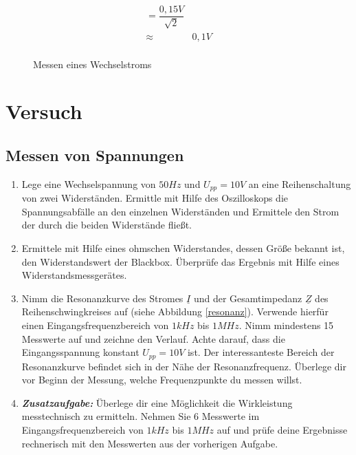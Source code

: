 \begin{figure}[H]
{\begin{minipage}[b]{5cm}
\begin{eqnarray*}
				= \dfrac{0,15V}{\sqrt{2}}\\
 		\approx	& 0,1V\\
\end{eqnarray*}
\end{minipage}
}
\caption{Messen eines Wechselstroms}
\end{figure}

\newpage
\section*{Versuch}

\subsection*{Messen von Spannungen}

\begin{enumerate}
\item Lege eine Wechselspannung von $50Hz$ und  $U_{pp} =10V$ an eine Reihenschaltung von zwei Widerständen. Ermittle mit Hilfe des Oszilloskops die Spannungsabfälle an den einzelnen Widerständen und Ermittele den Strom der durch die beiden Widerstände fließt.
\item Ermittele mit Hilfe eines ohmschen Widerstandes, dessen Größe bekannt ist, den Widerstandswert der Blackbox. Überprüfe das Ergebnis mit Hilfe eines Widerstandsmessgerätes.
\item Nimm die Resonanzkurve des Stromes $\underline{I}$ und der Gesamtimpedanz $\underline{Z}$ des Reihenschwingkreises auf (siehe Abbildung \ref{resonanz}). Verwende hierfür einen Eingangsfrequenzbereich von $1kHz$ bis $1MHz$. Nimm mindestens 15 Messwerte auf und zeichne den Verlauf. Achte darauf, dass die Eingangsspannung konstant $U_{pp} =10V$ ist. Der interessanteste Bereich der Resonanzkurve befindet sich in der Nähe der Resonanzfrequenz. Überlege dir vor Beginn der Messung, welche Frequenzpunkte du messen willst.
\item \emph{\textbf{Zusatzaufgabe:}} Überlege dir eine Möglichkeit die Wirkleistung messtechnisch zu ermitteln. Nehmen Sie 6 Messwerte im Eingangsfrequenzbereich von $1kHz$ bis $1MHz$ auf und prüfe deine Ergebnisse rechnerisch mit den Messwerten aus der vorherigen Aufgabe.
\end{enumerate}

